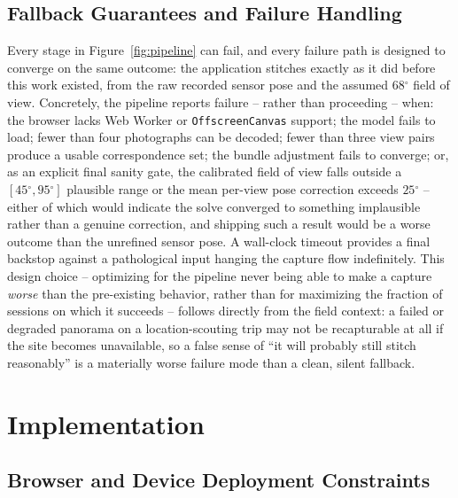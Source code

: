 \documentclass[11pt]{article}
\newcommand{\Deg}{\ensuremath{^{\circ}}}
\begin{document}
\subsection{Fallback Guarantees and Failure Handling}
\label{sec:fallback}

Every stage in Figure~\ref{fig:pipeline} can fail, and every failure path is designed to converge on the same outcome: the application stitches exactly as it did before this work existed, from the raw recorded sensor pose and the assumed $68\Deg$ field of view. Concretely, the pipeline reports failure -- rather than proceeding -- when: the browser lacks Web Worker or \texttt{OffscreenCanvas} support; the model fails to load; fewer than four photographs can be decoded; fewer than three view pairs produce a usable correspondence set; the bundle adjustment fails to converge; or, as an explicit final sanity gate, the calibrated field of view falls outside a $[45\Deg, 95\Deg]$ plausible range or the mean per-view pose correction exceeds $25\Deg$ -- either of which would indicate the solve converged to something implausible rather than a genuine correction, and shipping such a result would be a worse outcome than the unrefined sensor pose. A wall-clock timeout provides a final backstop against a pathological input hanging the capture flow indefinitely. This design choice -- optimizing for the pipeline never being able to make a capture \emph{worse} than the pre-existing behavior, rather than for maximizing the fraction of sessions on which it succeeds -- follows directly from the field context: a failed or degraded panorama on a location-scouting trip may not be recapturable at all if the site becomes unavailable, so a false sense of ``it will probably still stitch reasonably'' is a materially worse failure mode than a clean, silent fallback.

\section{Implementation}
\label{sec:implementation}

\subsection{Browser and Device Deployment Constraints}
\label{sec:constraints}
\end{document}
